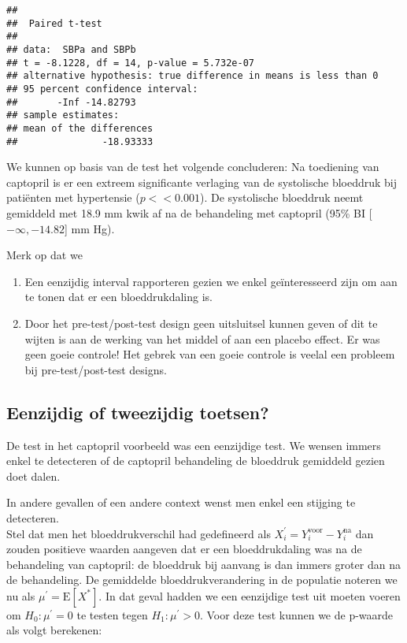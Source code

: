 \documentclass[
  12pt,dutch,coursenotes]{book}
\providecommand{\tightlist}{%
  \setlength{\itemsep}{0pt}\setlength{\parskip}{0pt}}
\theoremstyle{definition}
\theoremstyle{definition}
\theoremstyle{definition}
\theoremstyle{remark}
\begin{document}
\begin{verbatim}
## 
##  Paired t-test
## 
## data:  SBPa and SBPb
## t = -8.1228, df = 14, p-value = 5.732e-07
## alternative hypothesis: true difference in means is less than 0
## 95 percent confidence interval:
##       -Inf -14.82793
## sample estimates:
## mean of the differences 
##               -18.93333
\end{verbatim}

We kunnen op basis van de test het volgende concluderen:
Na toediening van captopril is er een extreem significante verlaging van de systolische bloeddruk bij patiënten met hypertensie
(\(p << 0.001\)). De systolische bloeddruk neemt gemiddeld met 18.9 mm kwik af na de behandeling met captopril (95\% BI {[}\(-\infty,-14.82\){]} mm Hg).

Merk op dat we

\begin{enumerate}
\def\labelenumi{\arabic{enumi}.}
\tightlist
\item
  Een eenzijdig interval rapporteren gezien we enkel geïnteresseerd zijn om aan te tonen dat er een bloeddrukdaling is.
\item
  Door het pre-test/post-test design geen uitsluitsel kunnen geven of dit te wijten is aan de werking van het middel of aan een placebo effect. Er was geen goeie controle! Het gebrek van een goeie controle is veelal een probleem bij pre-test/post-test designs.
\end{enumerate}

\hypertarget{eenzijdig-of-tweezijdig-toetsen}{%
\subsection{Eenzijdig of tweezijdig toetsen?}\label{eenzijdig-of-tweezijdig-toetsen}}

De test in het captopril voorbeeld was een eenzijdige test. We wensen immers enkel te detecteren of de captopril behandeling de bloeddruk gemiddeld gezien doet dalen.

In andere gevallen of een andere context wenst men enkel een stijging te detecteren.\\
Stel dat men het bloeddrukverschil had gedefineerd als \(X_{i}^\prime=Y_{i}^\text{voor}-Y_{i}^\text{na}\) dan zouden positieve waarden aangeven dat er een bloeddrukdaling was na de behandeling van captopril: de bloeddruk bij aanvang is dan immers groter dan na de behandeling.
De gemiddelde bloeddrukverandering in de populatie noteren we nu als \(\mu^\prime=\text{E}[X^*]\).
In dat geval hadden we een eenzijdige test uit moeten voeren om \(H_0: \mu^\prime=0\) te testen tegen \(H_1: \mu^\prime>0\).
Voor deze test kunnen we de p-waarde als volgt berekenen:
\end{document}

